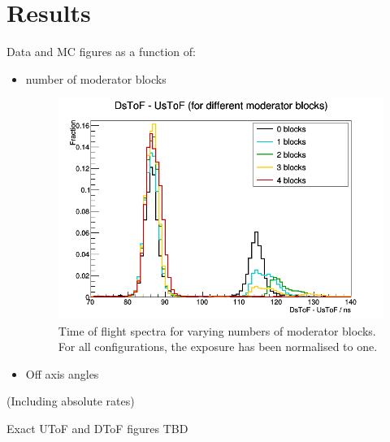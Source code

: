 \section{Results}
\label{hptpcPaper:sec:Results}
Data and MC figures as a function of:
\begin{itemize}
    \item number of moderator blocks
    \begin{figure}[h]
        \centering
        \includegraphics[width=0.7\linewidth]{files/Figures/AllInOne.png}
        \caption{Time of flight spectra for varying numbers of moderator blocks. For all configurations, the exposure has been normalised to one.}
        \label{fig:dtof_nmodblocks}
    \end{figure}
    \item Off axis angles
\end{itemize}
(Including absolute rates)

Exact UToF and DToF figures TBD